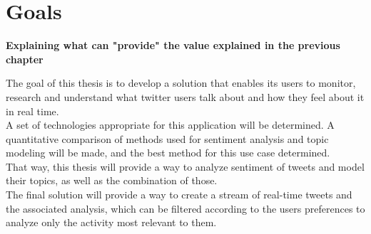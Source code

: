 \chapter{Goals}
\label{ch:goals}

\textbf{Explaining what can "provide" the value explained in the previous chapter}


The goal of this thesis is to develop a solution that enables its users to monitor,
research and understand what twitter users talk about and how they feel about it in real time.
\\
A set of technologies appropriate for this application will be determined.
A quantitative comparison of methods used for sentiment analysis and topic modeling will be made,
and the best method for this use case determined.
\\
That way, this thesis will provide a way to analyze sentiment of tweets and model their topics,
as well as the combination of those.
\\
The final solution will provide a way to create a stream of real-time tweets and the associated analysis,
which can be filtered according to the users preferences to analyze only the activity most relevant to them.

